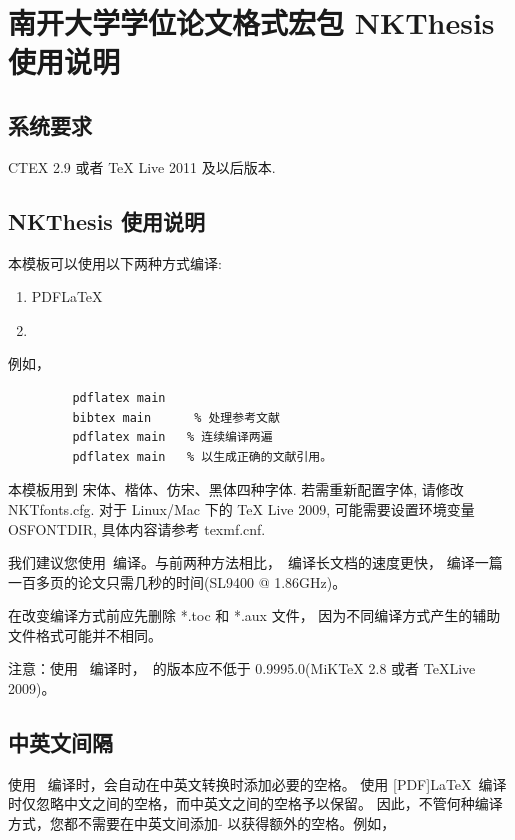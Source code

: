 
\chapter{南开大学学位论文格式宏包 NKThesis 使用说明}

\section{系统要求}

CTEX 2.9 或者 TeX Live 2011 及以后版本.

\section{NKThesis 使用说明}

本模板可以使用以下两种方式编译:
\begin{enumerate}
 \item PDF\LaTeX

 \item \XeLaTeX [推荐]
\end{enumerate}

例如，
\begin{verbatim}
         pdflatex main
         bibtex main      % 处理参考文献
         pdflatex main   % 连续编译两遍
         pdflatex main   % 以生成正确的文献引用。
\end{verbatim}





本模板用到 宋体、楷体、仿宋、黑体四种字体. 若需重新配置字体, 请修改 NKTfonts.cfg.
对于 Linux/Mac 下的 TeX Live 2009, 可能需要设置环境变量 OSFONTDIR, 具体内容请参考 texmf.cnf.


我们建议您使用\XeLaTeX\ 编译。与前两种方法相比，\XeLaTeX\  编译长文档的速度更快，
编译一篇一百多页的论文只需几秒的时间(SL9400 @ 1.86GHz)。

在改变编译方式前应先删除 *.toc 和 *.aux 文件，
因为不同编译方式产生的辅助文件格式可能并不相同。



注意：使用 \XeLaTeX\ 编译时，\XeTeX\ 的版本应不低于 0.9995.0(MiKTeX 2.8 或者 TeXLive 2009)。

\section{中英文间隔}

使用 \XeLaTeX\ 编译时，会自动在中英文转换时添加必要的空格。 使用 [PDF]\LaTeX\
编译时仅忽略中文之间的空格，而中英文之间的空格予以保留。
因此，不管何种编译方式，您都不需要在中英文间添加 $\tilde{}$ 以获得额外的空格。例如，

